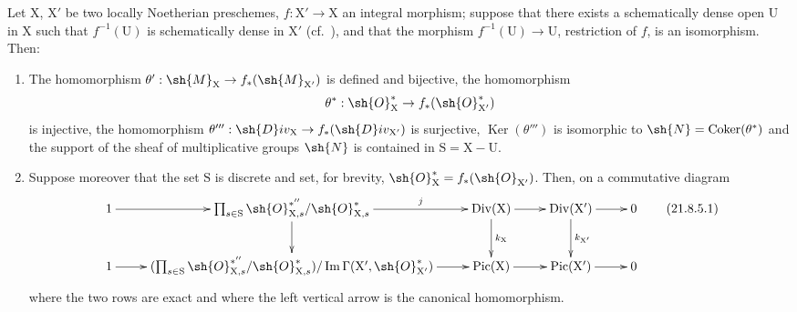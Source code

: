
\begin{proposition}[21.8.5]
\label{IV.21.8.5}
Let $\mathrm{X}$, $\mathrm{X}'$ be two locally Noetherian preschemes, $f:\mathrm{X}'\to\mathrm{X}$ an integral morphism;
suppose that there exists a schematically dense open $\mathrm{U}$ in $\mathrm{X}$ such that $f^{-1}(\mathrm{U})$ is schematically dense in $\mathrm{X}'$ (cf.\ ), and that the morphism $f^{-1}(\mathrm{U})\to\mathrm{U}$, restriction of $f$, is an isomorphism.
Then:
\begin{enumerate}[label=(\roman*)]
  \item The homomorphism $\theta':\sh{M}_\mathrm{X}\to f_*(\sh{M}_{\mathrm{X}'})$ is defined and bijective, the homomorphism
\[
  \theta^*:\sh{O}^*_\mathrm{X}\to f_*(\sh{O}^*_{\mathrm{X}'})
\]
is injective, the homomorphism $\theta''':\sh{D}iv_\mathrm{X}\to f_*(\sh{D}iv_{\mathrm{X}'})$ is surjective, $\operatorname{Ker}(\theta''')$ is isomorphic to $\sh{N}=\operatorname{Coker}(\theta^*)$ and the support of the sheaf of multiplicative groups $\sh{N}$ is contained in $\mathrm{S}=\mathrm{X}-\mathrm{U}$.
  \item Suppose moreover that the set $\mathrm{S}$ is discrete and set, for brevity, $\sh{O}^*_\mathrm{X}=f_*(\sh{O}_{\mathrm{X}'})$.
Then, on a commutative diagram
\[
\label{IV.21.8.5.1}
  \xymatrix{
    1 \ar[r] & \prod_{s\in\mathrm{S}}\sh{O}^{*''}_{\mathrm{X},s}/\sh{O}^*_{\mathrm{X},s} \ar[r]^-{j} \ar[d] & \operatorname{Div}(\mathrm{X}) \ar[r] \ar[d]^{k_\mathrm{X}} & \operatorname{Div}(\mathrm{X}') \ar[r] \ar[d]^{k_{\mathrm{X}'}} & 0\\
    1 \ar[r] & (\prod_{s\in\mathrm{S}}\sh{O}^{*''}_{\mathrm{X},s}/\sh{O}^*_{\mathrm{X},s})/\operatorname{Im}\Gamma(\mathrm{X}',\sh{O}^*_{\mathrm{X}'}) \ar[r]^-{} & \operatorname{Pic}(\mathrm{X}) \ar[r] & \operatorname{Pic}(\mathrm{X}') \ar[r] & 0
  }
  \tag{21.8.5.1}
\]
where the two rows are exact and where the left vertical arrow is the canonical homomorphism.
\end{enumerate}
\end{proposition}

